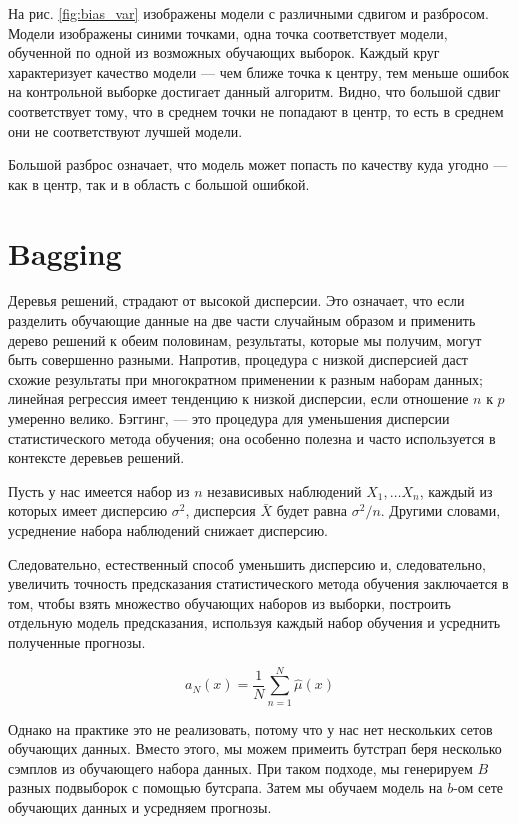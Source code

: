\documentclass{article}
\theoremstyle{definition}
\theoremstyle{theorem}
\theoremstyle{remark}
\theoremstyle{theorem}
\theoremstyle{example}
\theoremstyle{theorem}
\theoremstyle{theorem}
\theoremstyle{theorem}
\theoremstyle{theorem}
\begin{document}
На рис. \ref{fig:bias_var} изображены модели с различными сдвигом и разбросом. Модели изображены синими точками, одна точка соответствует модели, обученной по одной из возможных обучающих выборок. Каждый круг характеризует качество модели --- чем ближе точка к центру, тем меньше ошибок на контрольной выборке достигает данный алгоритм. Видно, что большой сдвиг соответствует тому, что в среднем точки не попадают в центр, то есть в среднем они не соответствуют лучшей модели.

Большой разброс означает, что модель может попасть по качеству куда угодно --- как в центр, так и в область с большой ошибкой.

\section{Bagging}

Деревья решений, страдают от высокой дисперсии. Это означает, что если разделить обучающие данные на две части случайным образом и применить дерево решений к обеим половинам, результаты, которые мы получим, могут быть совершенно разными. Напротив, процедура с низкой дисперсией даст схожие результаты при многократном применении к разным наборам данных; линейная регрессия имеет тенденцию к низкой дисперсии, если отношение $n$ к $p$ умеренно велико. Бэггинг, --- это процедура для уменьшения дисперсии статистического метода обучения; она особенно полезна и часто используется в контексте деревьев решений.

Пусть у нас имеется набор из $n$ независивых наблюдений $X_1,\ldots X_n$, каждый из которых имеет дисперсию $\sigma^2$, дисперсия $\bar{X}$ будет равна $\sigma^2/n$. Другими словами, усреднение набора наблюдений снижает дисперсию.

Следовательно, естественный способ уменьшить дисперсию и, следовательно, увеличить точность предсказания статистического метода обучения заключается в том, чтобы взять множество обучающих наборов из выборки, построить отдельную модель предсказания, используя каждый набор обучения и усреднить полученные прогнозы. 

\begin{equation}
	{a}_{N}(x) = \dfrac{1}{N}\sum_{n=1}^{N}\hat{\mu}(x)
\end{equation}

Однако на практике это не реализовать, потому что у нас нет нескольких сетов обучающих данных. Вместо этого, мы можем примеить бутстрап беря несколько сэмплов из обучающего набора данных. При таком подходе, мы генерируем $B$ разных подвыборок с помощью бутсрапа. Затем мы обучаем модель на $b$-ом сете обучающих данных и усредняем прогнозы.
\end{document}
